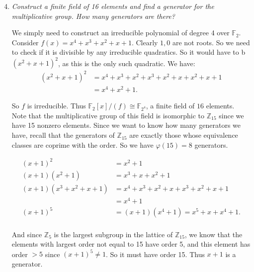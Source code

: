 \documentclass[10pt,oneside,reqno]{amsart}
\theoremstyle{plain}
\theoremstyle{definition}
\theoremstyle{remark}
\theoremstyle{plain}
\newcommand{\z}{\mathbb{Z}}
\newcommand{\F}{\mathbb{F}}
\newcommand{\bee}{\begin{equation}\begin{aligned}}
\newcommand{\eee}{\end{aligned}\end{equation}}
\renewcommand{\phi}{\varphi}
\begin{document}
\begin{enumerate}[label=\arabic*.]
\setcounter{enumi}{3}

\item \textit{Construct a finite field of 16 elements and find a generator for the multiplicative group. How many generators are there?}

We simply need to construct an irreducible polynomial of degree 4 over $\F_2$. Consider $f(x) = x^4 + x^3 + x^2 + x + 1$. Clearly $1,0$ are not roots. So we need to check if it is divisible by any irreducible quadratics. So it would have to b $(x^2 + x + 1)^2$, as this is the only such quadratic. We have:
\bee
(x^2 + x + 1)^2 &= x^4 + x^3 + x^2 + x^3 + x^2 + x + x^2 + x + 1\\
&= x^4 + x^2 + 1.
\eee

So $f$ is irreducible. Thus $\F_2[x]/(f) \cong \F_{2^4}$, a finite field of $16$ elements. Note that the multiplicative group of this field is isomorphic to $\z_{15}$ since we have 15 nonzero elements. Since we want to know how many generators we have, recall that the generators of $\z_{15}$ are exactly those whose equivalence classes are coprime with the order. So we have $\phi(15) = 8$ generators. 

\bee
(x + 1)^2 &= x^2 + 1\\
(x + 1)(x^2 + 1) &= x^3 + x + x^2 + 1\\
(x + 1)(x^3 + x^2 + x + 1) &= x^4 + x^3 + x^2 + x + x^3 + x^2 + x + 1\\
&= x^4 + 1\\
(x + 1)^5 &= (x + 1)(x^4 + 1) = x^5 + x + x^4 + 1.\\
\eee

And since $\z_5$ is the largest subgroup in the lattice of $\z_15$, we know that the elements with largest order not equal to 15 have order 5, and this element has order $> 5$ since $(x + 1)^5 \neq 1$. So it must have order 15. Thus $x + 1$ is a generator. 



\end{enumerate}
\end{document}
